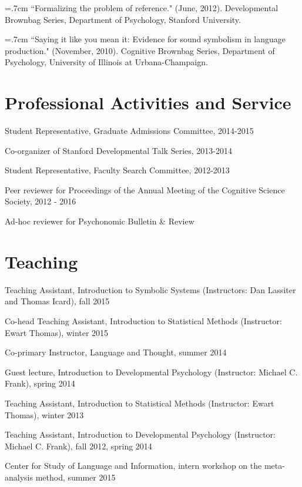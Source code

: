 \documentclass[letterpaper]{article}
\renewenvironment{itemize}{
  \begin{list}{}{
    \setlength{\leftmargin}{1.5em}
  }
}{
  \end{list}
}
\begin{document}
\hangindent=.7cm ``Formalizing the problem of reference."  (June, 2012). Developmental Brownbag Series, Department of Psychology, Stanford University.

\hangindent=.7cm ``Saying it like you mean it: Evidence for sound symbolism in language production." (November, 2010). Cognitive Brownbag Series, Department of Psychology, University of Illinois at Urbana-Champaign.

 
 
 \singlespacing

\section*{Professional Activities and Service}
\begin{itemize}
\item Student Representative, Graduate Admissions Committee, 2014-2015
\item  Co-organizer of Stanford Developmental Talk Series, 2013-2014
\item Student Representative, Faculty Search Committee, 2012-2013
\item Peer reviewer for Proceedings of the Annual Meeting of the Cognitive Science Society, 2012 -  2016
\item Ad-hoc reviewer for Psychonomic Bulletin \& Review 
\end{itemize}

\section*{Teaching}
\begin{itemize}
\item Teaching Assistant, Introduction to Symbolic Systems (Instructors: Dan Lassiter and Thomas Icard), fall 2015
\item Co-head Teaching Assistant, Introduction to Statistical Methods (Instructor: Ewart Thomas), winter 2015
\item Co-primary Instructor, Language and Thought, summer 2014
\item Guest lecture, Introduction to Developmental Psychology (Instructor: Michael C. Frank), spring 2014
\item Teaching Assistant, Introduction to Statistical Methods (Instructor: Ewart Thomas), winter 2013
\item Teaching Assistant, Introduction to Developmental Psychology (Instructor: Michael C. Frank), fall 2012, spring 2014
\item Center for Study of Language and Information, intern workshop on the meta-analysis method, summer 2015

\end{itemize}
\end{document}

